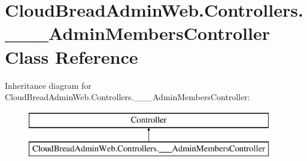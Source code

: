 \hypertarget{class_cloud_bread_admin_web_1_1_controllers_1_1_______admin_members_controller}{}\section{Cloud\+Bread\+Admin\+Web.\+Controllers.\+\_\+\+\_\+\+\_\+\+Admin\+Members\+Controller Class Reference}
\label{class_cloud_bread_admin_web_1_1_controllers_1_1_______admin_members_controller}
Inheritance diagram for Cloud\+Bread\+Admin\+Web.\+Controllers.\+\_\+\+\_\+\+\_\+\+Admin\+Members\+Controller\+:\begin{figure}[H]
\begin{center}
\leavevmode
\includegraphics[height=2.000000cm]{class_cloud_bread_admin_web_1_1_controllers_1_1_______admin_members_controller}
\end{center}
\end{figure}
